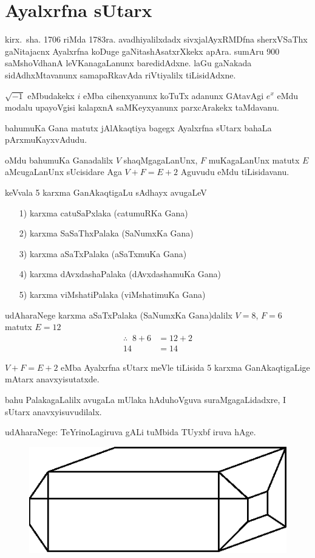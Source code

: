 \chapter{Ayalxrfna sUtarx}

\vskip -20pt

kirx.~sha. {\rm 1706} riMda {\rm 1783}ra. avadhiyalilxdadx sivxjalAyxRMDfna sherxVSaThx gaNitajacnx Ayalxrfna koDuge gaNitashAsatxrXkekx apAra. sumAru {\rm 900} saMshoVdhanA leVKanagaLanunx baredidAdxne. laGu gaNakada sidAdhxMtavanunx samapaRkavAda riVtiyalilx tiLisidAdxne.

$\sqrt{-1}$ eMbudakekx $i$ eMba cihenxyanunx koTuTx adanunx GAtavAgi $e^x$ eMdu modalu upayoVgisi kalapxnA saMKeyxyanunx parxcArakekx taMdavanu.

bahumuKa Gana matutx jAlAkaqtiya bagegx Ayalxrfna sUtarx bahaLa pArxmuKayx\-vAdudu.

oMdu bahumuKa Ganadalilx $V$ shaqMgagaLanUnx, $F$ muKagaLanUnx matutx $E$ aMcugaLanUnx sUcisidare Aga $V+F=E+2$ Aguvudu eMdu tiLisidavanu. 

keVvala {\rm 5} karxma GanAkaqtigaLu sAdhayx avugaLeV
\begin{enumerate}
\item[{\rm 1)}] karxma catuSaPxlaka (catumuRKa Gana)
\item[{\rm 2)}] karxma SaSaThxPalaka (SaNumxKa Gana)
\item[{\rm 3)}] karxma aSaTxPalaka (aSaTxmuKa Gana)
\item[{\rm 4)}] karxma dAvxdashaPalaka (dAvxdashamuKa Gana)
\item[{\rm 5)}] karxma viMshatiPalaka (viMshatimuKa Gana)
\end{enumerate}

\newpage
\phantom{a}

\vskip -0.7cm

udAharaNege karxma aSaTxPalaka (SaNumxKa Gana)dalilx \quad $V=8$, \quad $F=6$ matutx $E=12$
\begin{align*}
\therefore \;\; 8+6 &=12+2\\
14 &=14
\end{align*}

$V+F=E+2$ eMba Ayalxrfna sUtarx meVle tiLisida {\rm 5} karxma GanAkaqtigaLige mAtarx anavxyisutatxde.

bahu PalakagaLalilx avugaLa mUlaka hAduhoVguva suraMgagaLidadxre, I sUtarx anavxyisuvudilalx.

udAharaNege: TeYrinoLagiruva gALi tuMbida TUyxbf iruva hAge.
\begin{figure}[H]
\centering
\includegraphics{src/figures/m-147.eps}
\end{figure}

